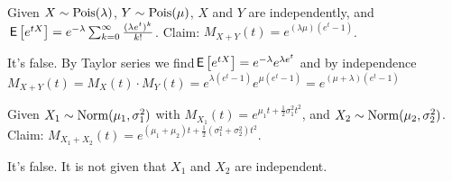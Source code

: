 \documentclass[tf-tutorial-all.tex]{subfiles}
\begin{document}
\begin{truefalse}
Given $X\sim \mathrm{Pois}(\lambda)$, $Y \sim \mathrm{Pois}(\mu)$, $X$ and $Y$ are independently, and $\,\mathsf{E}\left[e^{tX}\right] = e^{-\lambda}\sum^{\infty}_{k=0} \frac{(\lambda e^t)^k}{k!}$.
Claim: $M_{X+Y}(t) = e^{(\lambda \mu)(e^t-1)}$.
\begin{solution}
It's false. By Taylor series we find$ \,\mathsf{E}\left[e^{tX}\right] = e^{-\lambda} e^{\lambda e^t}$ and by independence $M_{X+Y}(t) = M_X(t) \cdot M_Y(t) = e^{\lambda(e^t-1)} e^{\mu(e^t-1)} = e^{(\mu + \lambda)(e^t-1)}$
\end{solution}
\end{truefalse}


\begin{truefalse}
Given $X_1\sim \mathrm{Norm}(\mu_1, \sigma_1^2)$ with $M_{X_1}(t) = e^{\mu_1t + \frac{1}{2}\sigma_1^2t^2}$, and $X_2\sim \mathrm{Norm}(\mu_2, \sigma_2^2)$.
Claim: $M_{X_1+X_2}(t) = e^{(\mu_1 + \mu_2)t +\frac{1}{2}(\sigma_1^2 + \sigma_2^2)t^2}$.
\begin{solution}
It's false. It is not given that $X_1$ and $X_2$ are independent.
\end{solution}
\end{truefalse}
\end{document}
